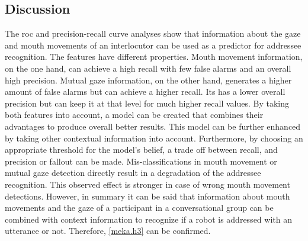 \subsection{Discussion}

The \gls{roc} and \gls{precision}-\gls{recall} curve analyses show that information about the gaze and mouth movements of an interlocutor can be used as a predictor for \gls{addressee} recognition.
The features have different properties.
Mouth movement information, on the one hand, can achieve a high \gls{recall} with few false alarms and an overall high \gls{precision}.
Mutual gaze information, on the other hand, generates a higher amount of false alarms but can achieve a higher \gls{recall}.
Its has a lower overall \gls{precision} but can keep it at that level for much higher \gls{recall} values.
By taking both features into account, a model can be created that combines their advantages to produce overall better results.
This model can be further enhanced by taking other contextual information into account.
Furthermore, by choosing an appropriate threshold for the model's belief, a trade off between \gls{recall}, and \gls{precision} or \gls{fallout} can be made.
Mis-classifications in mouth movement or mutual gaze detection directly result in a degradation of the \gls{addressee} recognition.
This observed effect is stronger in case of wrong mouth movement detections. 
However, in summary it can be said that information about mouth movements and the gaze of a participant in a \gls{conversational group} can be combined with context information to recognize if a \gls{robot} is addressed with an utterance or not.
Therefore, \cref{meka.h3} can be confirmed.


